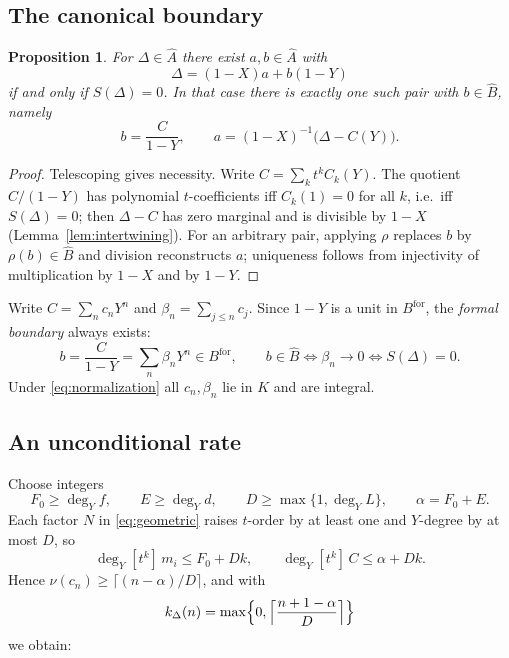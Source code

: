 \documentclass[11pt,a4paper]{article}
\newcommand{\Bhat}{\widehat B}
\newcommand{\Ahat}{\widehat A}
\newcommand{\Bfor}{B^{\mathrm{for}}}
\newcommand{\val}{\nu}
\theoremstyle{plain}
\newtheorem{proposition}[theorem]{Proposition}
\theoremstyle{definition}
\theoremstyle{remark}
\begin{document}
\subsection{The canonical boundary}

\begin{proposition}\label{prop:canonical}
For $\Delta\in\Ahat$ there exist $a,b\in\Ahat$ with
\begin{equation}\label{eq:boundary}
  \Delta=(1-X)a+b(1-Y)
\end{equation}
if and only if $S(\Delta)=0$. In that case there is exactly one such pair
with $b\in\Bhat$, namely
\[
  b=\frac{C}{1-Y},\qquad a=(1-X)^{-1}\bigl(\Delta-C(Y)\bigr).
\]
\end{proposition}
\begin{proof}
Telescoping gives necessity. Write $C=\sum_kt^kC_k(Y)$. The quotient
$C/(1-Y)$ has polynomial $t$-coefficients iff $C_k(1)=0$ for all $k$, i.e.\
iff $S(\Delta)=0$; then $\Delta-C$ has zero marginal and is divisible by $1-X$
(Lemma~\ref{lem:intertwining}). For an arbitrary pair, applying $\rho$ replaces
$b$ by $\rho(b)\in\Bhat$ and division reconstructs $a$; uniqueness follows from
injectivity of multiplication by $1-X$ and by $1-Y$.
\end{proof}

Write $C=\sum_nc_nY^n$ and $\beta_n=\sum_{j\le n}c_j$. Since $1-Y$ is a unit in
$\Bfor$, the \emph{formal boundary} always exists:
\begin{equation}\label{eq:partial-sums}
  b=\frac{C}{1-Y}=\sum_n\beta_nY^n\in\Bfor,\qquad
  b\in\Bhat\iff\beta_n\to0\iff S(\Delta)=0.
\end{equation}
Under \eqref{eq:normalization} all $c_n,\beta_n$ lie in $K$ and are integral.

\subsection{An unconditional rate}\label{sec:rate}
Choose integers
\[
  F_0\ge\deg_Yf,\qquad E\ge\deg_Yd,\qquad D\ge\max\{1,\deg_YL\},\qquad\alpha=F_0+E.
\]
Each factor $N$ in \eqref{eq:geometric} raises $t$-order by at least one and
$Y$-degree by at most $D$, so
\begin{equation}\label{eq:support}
  \deg_Y[t^k]\,m_i\le F_0+Dk,\qquad \deg_Y[t^k]\,C\le\alpha+Dk.
\end{equation}
Hence $\val(c_n)\ge\lceil (n-\alpha)/D\rceil$, and with
\begin{equation}\label{eq:rate}
  k_\Delta(n)=\max\Bigl\{0,\Bigl\lceil\frac{n+1-\alpha}{D}\Bigr\rceil\Bigr\}
\end{equation}
we obtain:
\end{document}
